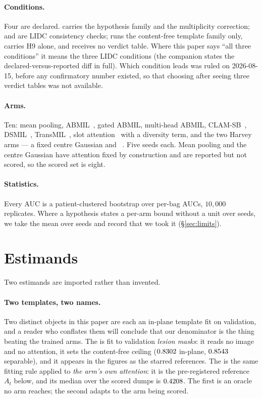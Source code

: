 \documentclass[10pt]{article}
\begin{document}
\paragraph{Conditions.} Four are declared. \condA{} carries the hypothesis
family and the multiplicity correction; \condB{} and \condC{} are LIDC
consistency checks; \condD{} runs the content-free template family only,
carries H9 alone, and receives no verdict table. Where this paper says ``all
three conditions'' it means the three LIDC conditions (the companion states the
declared-versus-reported diff in full). Which condition leads was ruled on
2026-08-15, before any confirmatory number existed, so that choosing after
seeing three verdict tables was not available.

\paragraph{Arms.} Ten: mean pooling, ABMIL~\citep{ilse2018}, gated ABMIL,
multi-head ABMIL, CLAM-SB~\citep{lu2021clam}, DSMIL~\citep{li2021dsmil},
TransMIL~\citep{shao2021transmil}, slot attention~\citep{locatello2020slot} with
a diversity term, and the two Harvey arms --- a fixed centre
Gaussian and \armNG{}~\citep{harvey2026normal}. Five seeds each.
Mean pooling and the centre Gaussian have attention fixed by construction and
are reported but not scored, so the scored set is eight.

\paragraph{Statistics.} Every AUC is a patient-clustered bootstrap over per-bag
AUCs, $10{,}000$ replicates. Where a hypothesis states a per-arm bound without a
unit over seeds, we take the mean over seeds and record that we took it
(\S\ref{sec:limits}).

\section{Estimands}

Two estimands are imported rather than invented.

\paragraph{Two templates, two names.} Two distinct objects in this paper are
each an in-plane template fit on validation, and a reader who conflates them
will conclude that our denominator is the thing beating the trained arms. The
\emph{\maskref{}} is fit to validation \emph{lesion masks}: it reads no image
and no attention, it sets the content-free ceiling ($0.8302$
in-plane, $0.8543$ separable), and it appears in the figures as the
starred references. The \emph{\attden{}} is the same fitting rule applied to
\emph{the arm's own attention}: it is the pre-registered reference $A_t$
below, and its median over the scored dumps is $0.4208$. The first is
an oracle no arm reaches; the second adapts to the arm being scored.
\end{document}

